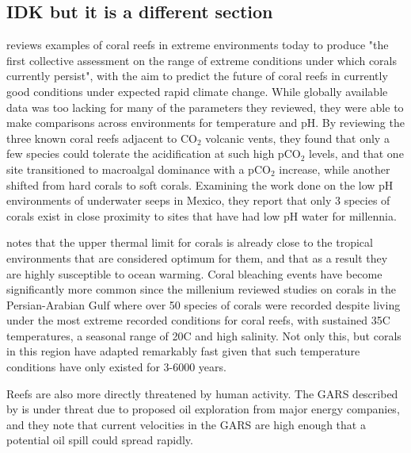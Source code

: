\documentclass[11pt,a4paper]{article}
\begin{document}
\subsection{IDK but it is a different section}





\cite{Camp2018} reviews examples of coral reefs in extreme environments today to produce "the first collective assessment on the range of extreme conditions under which corals currently persist", with the aim to predict the future of coral reefs in currently good conditions under expected rapid climate change. While globally available data was too lacking for many of the parameters they reviewed, they were able to make comparisons across environments for temperature and pH. By reviewing the three known coral reefs adjacent to CO$_{2}$ volcanic vents, they found that only a few species could tolerate the acidification at such high pCO$_{2}$ levels, and that one site transitioned to macroalgal dominance with a pCO$_{2}$ increase, while another shifted from hard corals to soft corals. Examining the work done on the low pH environments of underwater seeps in Mexico, they report that only 3 species of corals exist in close proximity to sites that have had low pH water for millennia. 

\cite{Camp2018} notes that the upper thermal limit for corals is already close to the tropical environments that are considered optimum for them, and that as a result they are highly susceptible to ocean warming. Coral bleaching events have become significantly more common since the millenium %
\cite{Camp2018} reviewed studies on corals in the Persian-Arabian Gulf where over 50 species of corals were recorded despite living under the most extreme recorded conditions for coral reefs, with sustained 35\textdegree C temperatures, a seasonal range of 20\textdegree C and high salinity. Not only this, but corals in this region have adapted remarkably fast given that such temperature conditions have only existed for 3-6000 years.

Reefs are also more directly threatened by human activity. The GARS described by \cite{Francini-Filho2018} is under threat due to proposed oil exploration from major energy companies, and they note that current velocities in the GARS are high enough that a potential oil spill could spread rapidly.
\end{document}
